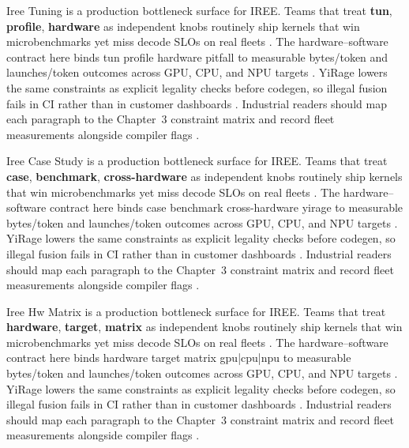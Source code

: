 Iree Tuning is a production bottleneck surface for IREE. Teams that treat \textbf{tun}, \textbf{profile}, \textbf{hardware} as independent knobs routinely ship kernels that win microbenchmarks yet miss decode SLOs on real fleets \citep{nvidia2024cudagraphs,taxbreak2026}. The hardware--software contract here binds tun profile hardware pitfall to measurable bytes/token and launches/token outcomes across GPU, CPU, and NPU targets \citep{liu2024deepseekv3,memoryfloor2026}. YiRage lowers the same constraints as explicit legality checks before codegen, so illegal fusion fails in CI rather than in customer dashboards \citep{patel2025llminference,nvidia2022hopper}. Industrial readers should map each paragraph to the Chapter~3 constraint matrix and record fleet measurements alongside compiler flags \citep{taxbreak2026,semianalysis2024tma}.

Iree Case Study is a production bottleneck surface for IREE. Teams that treat \textbf{case}, \textbf{benchmark}, \textbf{cross-hardware} as independent knobs routinely ship kernels that win microbenchmarks yet miss decode SLOs on real fleets \citep{liu2024deepseekv3,memoryfloor2026}. The hardware--software contract here binds case benchmark cross-hardware yirage to measurable bytes/token and launches/token outcomes across GPU, CPU, and NPU targets \citep{patel2025llminference,nvidia2022hopper}. YiRage lowers the same constraints as explicit legality checks before codegen, so illegal fusion fails in CI rather than in customer dashboards \citep{taxbreak2026,semianalysis2024tma}. Industrial readers should map each paragraph to the Chapter~3 constraint matrix and record fleet measurements alongside compiler flags \citep{memoryfloor2026,amd2024xdna}.

Iree Hw Matrix is a production bottleneck surface for IREE. Teams that treat \textbf{hardware}, \textbf{target}, \textbf{matrix} as independent knobs routinely ship kernels that win microbenchmarks yet miss decode SLOs on real fleets \citep{patel2025llminference,nvidia2022hopper}. The hardware--software contract here binds hardware target matrix gpu|cpu|npu to measurable bytes/token and launches/token outcomes across GPU, CPU, and NPU targets \citep{taxbreak2026,semianalysis2024tma}. YiRage lowers the same constraints as explicit legality checks before codegen, so illegal fusion fails in CI rather than in customer dashboards \citep{memoryfloor2026,amd2024xdna}. Industrial readers should map each paragraph to the Chapter~3 constraint matrix and record fleet measurements alongside compiler flags \citep{nvidia2022hopper,amd2024aie}.

